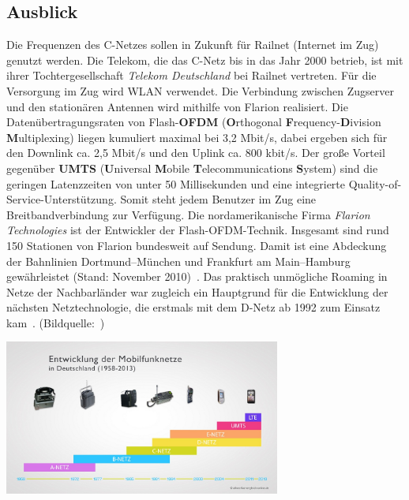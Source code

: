 \begin{multicols}{3}
\subsection*{Ausblick}
Die Frequenzen des C-Netzes sollen in Zukunft für Railnet (Internet im Zug) genutzt werden. Die Telekom, die das C-Netz bis in das Jahr 2000 betrieb, ist mit ihrer Tochtergesellschaft \textit{Telekom Deutschland} bei Railnet vertreten. Für die Versorgung im Zug wird WLAN verwendet. Die Verbindung zwischen Zugserver und den stationären Antennen wird mithilfe von Flarion realisiert. Die Datenübertragungsraten von Flash-\textbf{OFDM} (\textbf{O}rthogonal \textbf{F}requency-\textbf{D}ivision \textbf{M}ultiplexing) liegen kumuliert maximal bei 3,2 Mbit/s, dabei ergeben sich für den Downlink ca. 2,5 Mbit/s und den Uplink ca. 800 kbit/s. Der große Vorteil gegenüber \textbf{UMTS} (\textbf{U}niversal \textbf{M}obile \textbf{T}elecommunications \textbf{S}ystem) sind die geringen Latenzzeiten von unter 50 Millisekunden und eine integrierte Quality-of-Service-Unterstützung. Somit steht jedem Benutzer im Zug eine Breitbandverbindung zur Verfügung. 
Die nordamerikanische Firma \textit{Flarion Technologies} ist der Entwickler der Flash-OFDM-Technik. Insgesamt sind rund 150 Stationen von Flarion bundesweit auf Sendung. Damit ist eine Abdeckung der Bahnlinien Dortmund–München und Frankfurt am Main–Hamburg gewährleistet (Stand: November 2010)~\cite{c-netz.3}.
Das praktisch unmögliche Roaming in Netze der Nachbarländer war zugleich ein Hauptgrund für die Entwicklung der nächsten Netztechnologie, die erstmals mit dem D-Netz ab 1992 zum Einsatz kam~\cite{c-netz.1}. (Bildquelle:~\cite{c-netz.9})

\printbibliography[segment=6,heading=subbibliography]
\end{multicols}
\begin{Figure}
\centering
\includegraphics[height=51mm]{Kapitel/C-Netz/Grafiken/ueberblick.jpg}
\end{Figure}

\newpage
